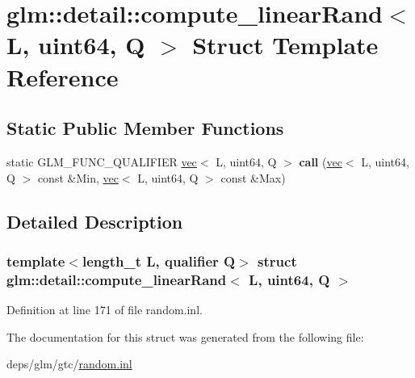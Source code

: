 \hypertarget{structglm_1_1detail_1_1compute__linearRand_3_01L_00_01uint64_00_01Q_01_4}{}\section{glm\+:\+:detail\+:\+:compute\+\_\+linear\+Rand$<$ L, uint64, Q $>$ Struct Template Reference}
\label{structglm_1_1detail_1_1compute__linearRand_3_01L_00_01uint64_00_01Q_01_4}
\subsection*{Static Public Member Functions}
\begin{DoxyCompactItemize}
\item 
\mbox{\label{structglm_1_1detail_1_1compute__linearRand_3_01L_00_01uint64_00_01Q_01_4_a802cbce0e4da77e16718ffb2657a821b}} 
static G\+L\+M\+\_\+\+F\+U\+N\+C\+\_\+\+Q\+U\+A\+L\+I\+F\+I\+ER \hyperlink{structglm_1_1vec}{vec}$<$ L, uint64, Q $>$ {\bfseries call} (\hyperlink{structglm_1_1vec}{vec}$<$ L, uint64, Q $>$ const \&Min, \hyperlink{structglm_1_1vec}{vec}$<$ L, uint64, Q $>$ const \&Max)
\end{DoxyCompactItemize}


\subsection{Detailed Description}
\subsubsection*{template$<$length\+\_\+t L, qualifier Q$>$\newline
struct glm\+::detail\+::compute\+\_\+linear\+Rand$<$ L, uint64, Q $>$}



Definition at line 171 of file random.\+inl.



The documentation for this struct was generated from the following file\+:\begin{DoxyCompactItemize}
\item 
deps/glm/gtc/\hyperlink{random_8inl}{random.\+inl}\end{DoxyCompactItemize}
